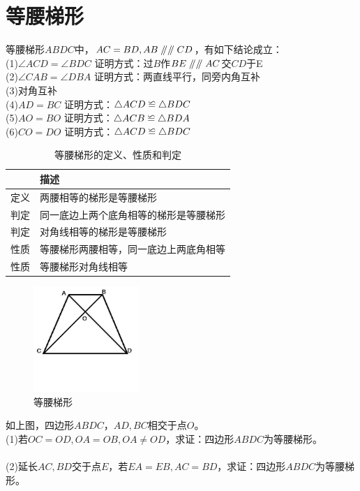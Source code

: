 \documentclass{ecnuthesis}
\newcommand\px{\mathrel{/\mkern-5mu/}}  %
\newcommand\backcong{\mathrel{\reflectbox{$\cong$}}}
\begin{document}
\section{等腰梯形}
\begin{knowledge}
    等腰梯形$ABDC$中，$AC=BD,AB\px\px CD$，有如下结论成立： \\
    (1)$\angle ACD=\angle BDC $  证明方式：过$B$作$BE \px \px AC$交$CD$于E \\
    (2)$\angle CAB=\angle DBA $  证明方式：两直线平行，同旁内角互补\\
    (3)对角互补 \\
    (4)$AD=BC$ 证明方式：$\triangle ACD \backcong \triangle BDC$ \\
    (5)$AO=BO$ 证明方式：$\triangle ACB \backcong \triangle BDA$ \\
    (6)$CO=DO$ 证明方式：$\triangle ACD\backcong \triangle BDC$
\end{knowledge}
\begin{table}[H]
\centering
\caption{等腰梯形的定义、性质和判定}
\begin{tabular}{|l|l|}
\hline
    & 描述 \\
\hline
定义 & 两腰相等的梯形是等腰梯形 \\
\hline
判定 & 同一底边上两个底角相等的梯形是等腰梯形 \\
\hline
判定 & 对角线相等的梯形是等腰梯形 \\
\hline
性质 & 等腰梯形两腰相等，同一底边上两底角相等 \\
\hline
性质 & 等腰梯形对角线相等 \\
\hline
\end{tabular}
\end{table}
\begin{figure}[H]
\centering
\includegraphics[width=4cm]{picture/633.jpeg}
\caption{等腰梯形}
\end{figure}
\begin{problem}
    如上图，四边形$ABDC$，$AD,BC$相交于点$O$。\\
    (1)若$OC=OD,OA=OB,OA\ne OD$，求证：四边形$ABDC$为等腰梯形。 \\
    \\
    (2)延长$AC,BD$交于点$E$，若$EA=EB,AC=BD$，求证：四边形$ABDC$为等腰梯形。\\
\end{problem}
\end{document}
